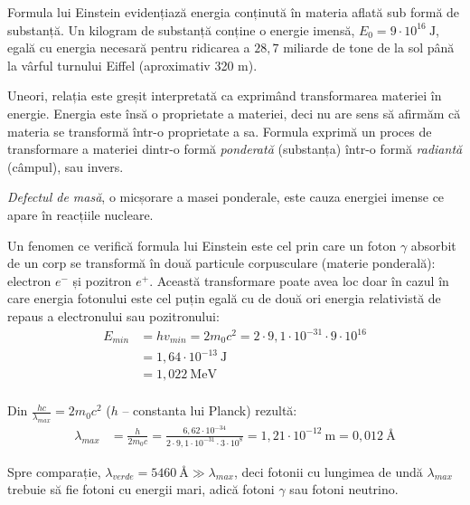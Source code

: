 Formula lui Einstein evidențiază energia conținută în materia aflată sub formă
de substanță. Un kilogram de substanță conține o energie imensă,
\( E_0 = 9 \cdot 10^{16} ~ \mathrm{J} \), egală cu energia necesară pentru
ridicarea a $28,7$ miliarde de tone de la sol până la vârful turnului Eiffel
(aproximativ 320 m).

Uneori, relația este greșit interpretată ca exprimând transformarea materiei în
energie. Energia este însă o proprietate a materiei, deci nu are sens să afirmăm
că materia se transformă într-o proprietate a sa. Formula exprimă un proces de
transformare a materiei dintr-o formă \emph{ponderată} (substanța) într-o formă
\emph{radiantă} (câmpul), sau invers.

\emph{Defectul de masă}, o micșorare a masei ponderale, este cauza energiei imense
ce apare în reacțiile nucleare.

Un fenomen ce verifică formula lui Einstein este cel prin care un foton
$\gamma$ absorbit de un corp se transformă în două particule corpusculare (materie
ponderală): electron $e^-$ și pozitron $e^+$. Această transformare poate avea loc
doar în cazul în care energia fotonului este cel puțin egală cu de două ori
energia relativistă de repaus a electronului sau pozitronului:
\begin{align*}
    E_{min} &= hv_{min} = 2m_0c^2 = 2\cdot9,1\cdot10^{-31}\cdot9\cdot10^{16} \\
            &= 1,64\cdot10^{-13} ~ \mathrm{J} \\
            &= 1,022 ~ \mathrm{MeV} \\
\end{align*}

Din \( \frac{hc}{\lambda_{max}} = 2m_0c^2 \) ($h$ -- constanta lui Planck) rezultă:
\begin{align*}
    \lambda_{max} &= \frac{h}{2m_0c}
                  = \frac{6,62\cdot10^{-34}}{2\cdot9,1\cdot10^{-31}\cdot3\cdot10^8}
                  = 1,21\cdot10^{-12} ~ \mathrm{m} = 0,012 ~ \text{\AA}
\end{align*}

Spre comparație, \( \lambda_{verde} = 5460 ~ \text{\AA} \gg \lambda_{max} \),
deci fotonii cu lungimea de undă $\lambda_{max}$ trebuie să fie fotoni cu energii
mari, adică fotoni $\gamma$ sau fotoni neutrino. %


